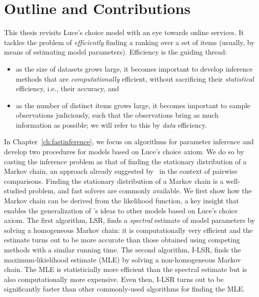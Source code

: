 \section{Outline and Contributions}
\label{in:sec:outline}

This thesis revisits Luce's choice model with an eye towards online services.
It tackles the problem of \emph{efficiently} finding a ranking over a set of items (usually, by means of estimating model parameters).
Efficiency is the guiding thread:
\begin{itemize}
\item as the size of datasets grows large, it becomes important to develop inference methods that are \emph{computationally} efficient, without sacrificing their \emph{statistical} efficiency, i.e., their accuracy, and
\item as the number of distinct items grows large, it becomes important to sample observations judiciously, such that the observations bring as much information as possible; we will refer to this by \emph{data} efficiency.
\end{itemize}

In Chapter~\ref{ch:fastinference}, we focus on algorithms for parameter inference and develop two procedures for models based on Luce's choice axiom.
We do so by casting the inference problem as that of finding the stationary distribution of a Markov chain, an approach already suggested by~\citet{negahban2012iterative} in the context of pairwise comparisons.
Finding the stationary distribution of a Markov chain is a well-studied problem, and fast solvers are commonly available.
We first show how the Markov chain can be derived from the likelihood function, a key insight that enables the generalization of \citeauthor{negahban2012iterative}'s ideas to other models based on Luce's choice axiom.
The first algorithm, LSR, finds a \emph{spectral} estimate of model parameters by solving a homogeneous Markov chain: it is computationally very efficient and the estimate turns out to be more accurate than those obtained using competing methods with a similar running time.
The second algorithm, I-LSR, finds the maximum-likielihood estimate (MLE) by solving a non-homogeneous Markov chain.
The MLE is statisticially more efficient than the spectral estimate but is also computationally more expensive.
Even then, I-LSR turns out to be significantly faster than other commonly-used algorithms for finding the MLE.

